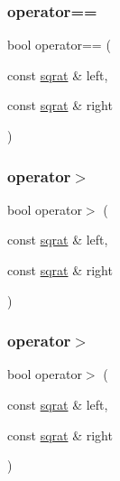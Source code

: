 \mbox{\label{classsqrat_aa31a4a7298644b244db89e455265c946}} 
\subsubsection{\texorpdfstring{operator==}{operator==}\hspace{0.1cm}{\footnotesize\ttfamily [3/3]}}
{\footnotesize\ttfamily bool operator== (\begin{DoxyParamCaption}\item[{const \mbox{\hyperlink{classsqrat}{sqrat}} \&}]{left,  }\item[{const \mbox{\hyperlink{classsqrat}{sqrat}} \&}]{right }\end{DoxyParamCaption})\hspace{0.3cm}{\ttfamily [friend]}}

\mbox{\label{classsqrat_a0a9ebc0afb8356e073d69a69d1450a65}} 
\subsubsection{\texorpdfstring{operator$>$}{operator>}\hspace{0.1cm}{\footnotesize\ttfamily [1/3]}}
{\footnotesize\ttfamily bool operator$>$ (\begin{DoxyParamCaption}\item[{const \mbox{\hyperlink{classsqrat}{sqrat}} \&}]{left,  }\item[{const \mbox{\hyperlink{classsqrat}{sqrat}} \&}]{right }\end{DoxyParamCaption})\hspace{0.3cm}{\ttfamily [friend]}}

\mbox{\label{classsqrat_a0a9ebc0afb8356e073d69a69d1450a65}} 
\subsubsection{\texorpdfstring{operator$>$}{operator>}\hspace{0.1cm}{\footnotesize\ttfamily [2/3]}}
{\footnotesize\ttfamily bool operator$>$ (\begin{DoxyParamCaption}\item[{const \mbox{\hyperlink{classsqrat}{sqrat}} \&}]{left,  }\item[{const \mbox{\hyperlink{classsqrat}{sqrat}} \&}]{right }\end{DoxyParamCaption})\hspace{0.3cm}{\ttfamily [friend]}}

